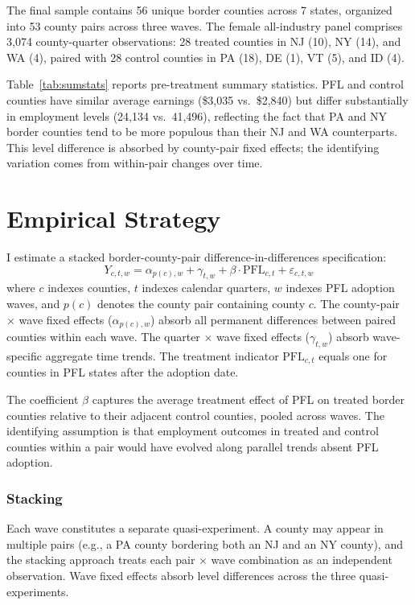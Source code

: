 \documentclass[12pt]{article}
\begin{document}
The final sample contains 56 unique border counties across 7 states, organized into 53 county pairs across three waves. The female all-industry panel comprises 3,074 county-quarter observations: 28 treated counties in NJ (10), NY (14), and WA (4), paired with 28 control counties in PA (18), DE (1), VT (5), and ID (4).



Table~\ref{tab:sumstats} reports pre-treatment summary statistics. PFL and control counties have similar average earnings (\$3,035 vs.\ \$2,840) but differ substantially in employment levels (24,134 vs.\ 41,496), reflecting the fact that PA and NY border counties tend to be more populous than their NJ and WA counterparts. This level difference is absorbed by county-pair fixed effects; the identifying variation comes from within-pair changes over time.


\section{Empirical Strategy}

I estimate a stacked border-county-pair difference-in-differences specification:
\begin{equation}
Y_{c,t,w} = \alpha_{p(c),w} + \gamma_{t,w} + \beta \cdot \text{PFL}_{c,t} + \varepsilon_{c,t,w}
\label{eq:main}
\end{equation}
where $c$ indexes counties, $t$ indexes calendar quarters, $w$ indexes PFL adoption waves, and $p(c)$ denotes the county pair containing county $c$. The county-pair $\times$ wave fixed effects ($\alpha_{p(c),w}$) absorb all permanent differences between paired counties within each wave. The quarter $\times$ wave fixed effects ($\gamma_{t,w}$) absorb wave-specific aggregate time trends. The treatment indicator $\text{PFL}_{c,t}$ equals one for counties in PFL states after the adoption date.

The coefficient $\beta$ captures the average treatment effect of PFL on treated border counties relative to their adjacent control counties, pooled across waves. The identifying assumption is that employment outcomes in treated and control counties within a pair would have evolved along parallel trends absent PFL adoption.

\subsubsection*{Stacking} Each wave constitutes a separate quasi-experiment. A county may appear in multiple pairs (e.g., a PA county bordering both an NJ and an NY county), and the stacking approach treats each pair $\times$ wave combination as an independent observation. Wave fixed effects absorb level differences across the three quasi-experiments.
\end{document}
